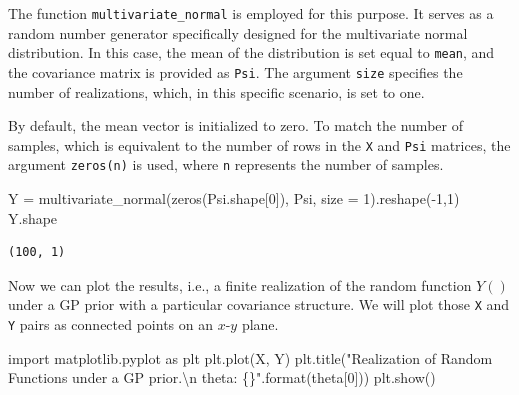 \documentclass[
  letterpaper,
  DIV=11,
  numbers=noendperiod]{scrreprt}
\newenvironment{Shaded}{\begin{snugshade}}{\end{snugshade}}
\newcommand{\BuiltInTok}[1]{\textcolor[rgb]{0.00,0.23,0.31}{#1}}
\newcommand{\CharTok}[1]{\textcolor[rgb]{0.13,0.47,0.30}{#1}}
\newcommand{\DecValTok}[1]{\textcolor[rgb]{0.68,0.00,0.00}{#1}}
\newcommand{\ImportTok}[1]{\textcolor[rgb]{0.00,0.46,0.62}{#1}}
\newcommand{\NormalTok}[1]{\textcolor[rgb]{0.00,0.23,0.31}{#1}}
\newcommand{\OperatorTok}[1]{\textcolor[rgb]{0.37,0.37,0.37}{#1}}
\newcommand{\SpecialCharTok}[1]{\textcolor[rgb]{0.37,0.37,0.37}{#1}}
\newcommand{\StringTok}[1]{\textcolor[rgb]{0.13,0.47,0.30}{#1}}
\begin{document}
The function \texttt{multivariate\_normal} is employed for this purpose.
It serves as a random number generator specifically designed for the
multivariate normal distribution. In this case, the mean of the
distribution is set equal to \texttt{mean}, and the covariance matrix is
provided as \texttt{Psi}. The argument \texttt{size} specifies the
number of realizations, which, in this specific scenario, is set to one.

By default, the mean vector is initialized to zero. To match the number
of samples, which is equivalent to the number of rows in the \texttt{X}
and \texttt{Psi} matrices, the argument \texttt{zeros(n)} is used, where
\texttt{n} represents the number of samples.

\begin{Shaded}
\begin{Highlighting}[]
\NormalTok{Y }\OperatorTok{=}\NormalTok{ multivariate\_normal(zeros(Psi.shape[}\DecValTok{0}\NormalTok{]), Psi, size }\OperatorTok{=} \DecValTok{1}\NormalTok{).reshape(}\OperatorTok{{-}}\DecValTok{1}\NormalTok{,}\DecValTok{1}\NormalTok{)}
\NormalTok{Y.shape}
\end{Highlighting}
\end{Shaded}

\begin{verbatim}
(100, 1)
\end{verbatim}

Now we can plot the results, i.e., a finite realization of the random
function \(Y()\) under a GP prior with a particular covariance
structure. We will plot those \texttt{X} and \texttt{Y} pairs as
connected points on an \(x\)-\(y\) plane.

\begin{Shaded}
\begin{Highlighting}[]
\ImportTok{import}\NormalTok{ matplotlib.pyplot }\ImportTok{as}\NormalTok{ plt}
\NormalTok{plt.plot(X, Y)}
\NormalTok{plt.title(}\StringTok{"Realization of Random Functions under a GP prior.}\CharTok{\textbackslash{}n}\StringTok{ theta: }\SpecialCharTok{\{\}}\StringTok{"}\NormalTok{.}\BuiltInTok{format}\NormalTok{(theta[}\DecValTok{0}\NormalTok{]))}
\NormalTok{plt.show()}
\end{Highlighting}
\end{Shaded}
\end{document}
